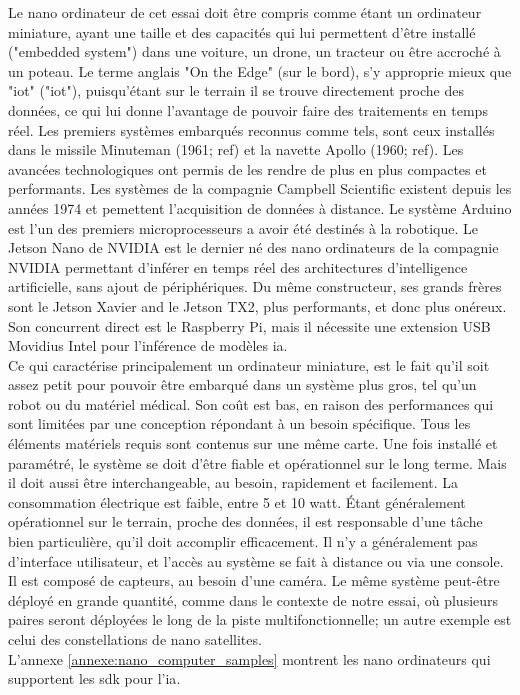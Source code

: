 ﻿\noindent Le nano ordinateur de cet essai doit être compris comme étant un ordinateur miniature, ayant une taille et des capacités qui lui permettent d'être installé ("embedded system") dans une voiture, un drone, un tracteur ou être accroché à un poteau. Le terme anglais "On the Edge" (sur le bord), s'y approprie mieux que "\acrshort{iot}" ("\acrlong{iot}"), puisqu'étant sur le terrain il se trouve directement proche des données, ce qui lui donne l'avantage de pouvoir faire des traitements en temps réel. Les premiers systèmes embarqués reconnus comme tels, sont ceux installés dans le missile Minuteman (1961; ref) et la navette Apollo (1960; ref). Les avancées technologiques ont permis de les rendre de plus en plus compactes et performants. Les systèmes de la compagnie Campbell Scientific existent depuis les années 1974 et pemettent l'acquisition de données à distance. Le système Arduino est l'un des premiers microprocesseurs a avoir été destinés à la robotique. Le Jetson Nano de NVIDIA est le dernier né des nano ordinateurs de la compagnie NVIDIA permettant d'inférer en temps réel des architectures d'intelligence artificielle, sans ajout de périphériques. Du même constructeur, ses grands frères sont le Jetson Xavier and le Jetson TX2, plus performants, et donc plus onéreux. Son concurrent direct est le Raspberry Pi, mais il nécessite une extension USB Movidius Intel pour l'inférence de modèles \acrshort{ia}. 
\vspace{\baselineskip}
\\
\noindent Ce qui caractérise principalement un ordinateur miniature, est le fait qu'il soit assez petit pour pouvoir être embarqué dans un système plus gros, tel qu'un robot ou du matériel médical. Son coût est bas, en raison des performances qui sont limitées par une conception répondant à un besoin spécifique. Tous les éléments matériels requis sont contenus sur une même carte. Une fois installé et paramétré, le système se doit d'être fiable et opérationnel sur le long terme. Mais il doit aussi être interchangeable, au besoin, rapidement et facilement. La consommation électrique est faible, entre 5 et 10 watt. Étant généralement opérationnel sur le terrain, proche des données, il est responsable d'une tâche bien particulière, qu'il doit accomplir efficacement. Il n'y a généralement pas d'interface utilisateur, et l'accès au système se fait à distance ou via une console. Il est composé de capteurs, au besoin d'une caméra. Le même système peut-être déployé en grande quantité, comme dans le contexte de notre essai, où plusieurs paires seront déployées le long de la piste multifonctionnelle; un autre exemple est celui des constellations de nano satellites.
\vspace{\baselineskip}
\\
\noindent L'annexe \ref{annexe:nano_computer_samples} montrent les nano ordinateurs qui supportent les \acrshort{sdk} pour l'\acrshort{ia}.
